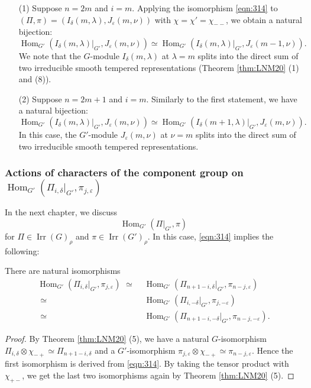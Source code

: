 \begin{example}
\label{ex:tempdual}
\begin{enumerate}
\item[{\rm{(1)}}]
Suppose $n=2m$ and $i=m$.  
Applying the isomorphism \eqref{eqn:314} to $(\Pi,\pi)=(I_{\delta}(m,\lambda), J_{\varepsilon}(m,\nu))$
 with $\chi=\chi'=\chi_{--}$, 
 we obtain a natural bijection:
\[
   {\operatorname{Hom}}_{G'}
    (I_{\delta}(m,\lambda)|_{G'}, J_{\varepsilon}(m,\nu))
    \simeq
    {\operatorname{Hom}}_{G'}
    (I_{\delta}(m,\lambda)|_{G'}, J_{\varepsilon}(m-1,\nu)).  
\]
We note that the $G$-module $I_{\delta}(m,\lambda)$
 at $\lambda=m$ splits into the direct sum
 of two irreducible smooth tempered representations
 (Theorem \ref{thm:LNM20} (1) and (8)).  
\item[{\rm{(2)}}]
Suppose $n=2m+1$ and $i=m$.  
Similarly to the first statement,
 we have a natural bijection:
\[
   {\operatorname{Hom}}_{G'}
    (I_{\delta}(m,\lambda)|_{G'}, J_{\varepsilon}(m,\nu))
    \simeq
    {\operatorname{Hom}}_{G'}
    (I_{\delta}(m+1,\lambda)|_{G'}, J_{\varepsilon}(m,\nu)).  
\]
In this case,
 the $G'$-module $J_{\varepsilon}(m,\nu)$ at $\nu=m$
 splits into the direct sum
 of two irreducible smooth tempered representations.  
\end{enumerate}
\end{example}

\subsubsection{Actions of characters of the component group 
 on ${\operatorname{Hom}}_{G'}(\Pi_{i,\delta}|_{G'}, \pi_{j,\varepsilon})$}
In the next chapter,
 we discuss 
\[
 {\operatorname{Hom}}_{G'}(\Pi|_{G'}, \pi)
\]
 for $\Pi \in {\operatorname{Irr}}(G)_{\rho}$
 and $\pi \in {\operatorname{Irr}}(G')_{\rho}$.  
In this case,
 \eqref{eqn:314} implies the following:
\begin{proposition}
\label{prop:SBOdual}
There are natural isomorphisms
\begin{align*}
   {\operatorname{Hom}}_{G'}(\Pi_{i,\delta}|_{G'}, \pi_{j,\varepsilon})
   \,\,\simeq\,\,&
   {\operatorname{Hom}}_{G'}(\Pi_{n+1-i,\delta}|_{G'}, \pi_{n-j,\varepsilon})
\\
   \,\,\simeq\,\,&
   {\operatorname{Hom}}_{G'}(\Pi_{i,-\delta}|_{G'}, \pi_{j,-\varepsilon})
\\
   \,\,\simeq\,\,&
{\operatorname{Hom}}_{G'}(\Pi_{n+1-i,-\delta}|_{G'}, \pi_{n-j,-\varepsilon}).  
\end{align*}
\end{proposition}
\begin{proof}
By Theorem \ref{thm:LNM20} (5),  
 we have a natural $G$-isomorphism
$\Pi_{i,\delta} \otimes \chi_{-+} \simeq \Pi_{n+1-i,\delta}$
 and a $G'$-isomorphism
 $\pi_{j,\varepsilon} \otimes \chi_{-+} \simeq \pi_{n-j,\varepsilon}$.  
Hence the first isomorphism is derived from \eqref{eqn:314}.  
By taking the tensor product with $\chi_{+-}$, 
 we get the last two isomorphisms
 again by Theorem \ref{thm:LNM20} (5).  
\end{proof}


